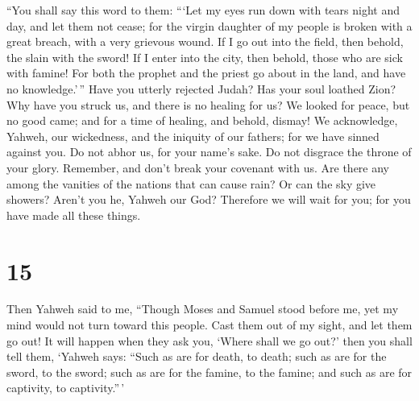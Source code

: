  ``You shall say this word to them: ```Let my eyes run down
with tears night and day, and let them not cease; for the virgin
daughter of my people is broken with a great breach, with a very
grievous wound.  If I go out into the field, then behold,
the slain with the sword! If I enter into the city, then behold, those
who are sick with famine! For both the prophet and the priest go about
in the land, and have no knowledge.'\,''  Have you utterly
rejected Judah? Has your soul loathed Zion? Why have you struck us, and
there is no healing for us? We looked for peace, but no good came; and
for a time of healing, and behold, dismay!  We acknowledge,
Yahweh, our wickedness, and the iniquity of our fathers; for we have
sinned against you.  Do not abhor us, for your name's sake.
Do not disgrace the throne of your glory. Remember, and don't break your
covenant with us.  Are there any among the vanities of the
nations that can cause rain? Or can the sky give showers? Aren't you he,
Yahweh our God? Therefore we will wait for you; for you have made all
these things.

\hypertarget{section-14}{%
\section{15}\label{section-14}}

 Then Yahweh said to me, ``Though Moses and Samuel stood
before me, yet my mind would not turn toward this people. Cast them out
of my sight, and let them go out!  It will happen when they
ask you, `Where shall we go out?' then you shall tell them, `Yahweh
says: ``Such as are for death, to death; such as are for the sword, to
the sword; such as are for the famine, to the famine; and such as are
for captivity, to captivity.''\,'

